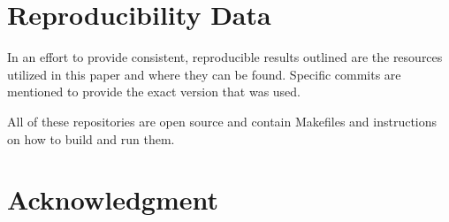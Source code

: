\documentclass[sigconf]{acmart}
\begin{document}
\section{Reproducibility Data}

In an effort to provide consistent, reproducible results outlined are the
resources utilized in this paper and where they can be found.
Specific commits are mentioned to provide the exact version that was used.


All of these repositories are open source and contain Makefiles
and instructions on how to build and run them.

\section*{Acknowledgment}




\end{document}
